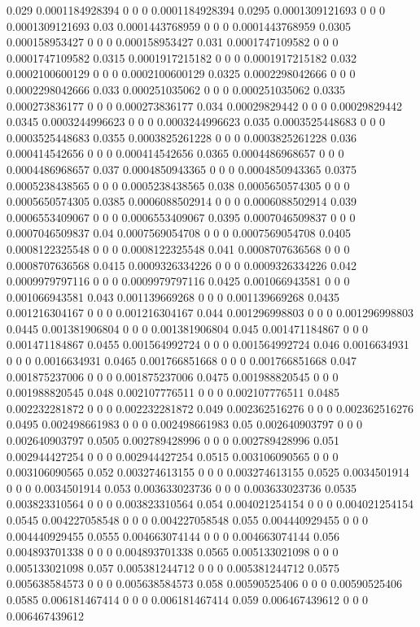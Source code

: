 {0.029 0.0001184928394 0 0 0 0.0001184928394
0.0295 0.0001309121693 0 0 0 0.0001309121693
0.03 0.0001443768959 0 0 0 0.0001443768959
0.0305 0.000158953427 0 0 0 0.000158953427
0.031 0.0001747109582 0 0 0 0.0001747109582
0.0315 0.0001917215182 0 0 0 0.0001917215182
0.032 0.0002100600129 0 0 0 0.0002100600129
0.0325 0.0002298042666 0 0 0 0.0002298042666
0.033 0.000251035062 0 0 0 0.000251035062
0.0335 0.000273836177 0 0 0 0.000273836177
0.034 0.00029829442 0 0 0 0.00029829442
0.0345 0.0003244996623 0 0 0 0.0003244996623
0.035 0.0003525448683 0 0 0 0.0003525448683
0.0355 0.0003825261228 0 0 0 0.0003825261228
0.036 0.000414542656 0 0 0 0.000414542656
0.0365 0.0004486968657 0 0 0 0.0004486968657
0.037 0.0004850943365 0 0 0 0.0004850943365
0.0375 0.0005238438565 0 0 0 0.0005238438565
0.038 0.0005650574305 0 0 0 0.0005650574305
0.0385 0.0006088502914 0 0 0 0.0006088502914
0.039 0.0006553409067 0 0 0 0.0006553409067
0.0395 0.0007046509837 0 0 0 0.0007046509837
0.04 0.0007569054708 0 0 0 0.0007569054708
0.0405 0.0008122325548 0 0 0 0.0008122325548
0.041 0.0008707636568 0 0 0 0.0008707636568
0.0415 0.0009326334226 0 0 0 0.0009326334226
0.042 0.0009979797116 0 0 0 0.0009979797116
0.0425 0.001066943581 0 0 0 0.001066943581
0.043 0.001139669268 0 0 0 0.001139669268
0.0435 0.001216304167 0 0 0 0.001216304167
0.044 0.001296998803 0 0 0 0.001296998803
0.0445 0.001381906804 0 0 0 0.001381906804
0.045 0.001471184867 0 0 0 0.001471184867
0.0455 0.001564992724 0 0 0 0.001564992724
0.046 0.0016634931 0 0 0 0.0016634931
0.0465 0.001766851668 0 0 0 0.001766851668
0.047 0.001875237006 0 0 0 0.001875237006
0.0475 0.001988820545 0 0 0 0.001988820545
0.048 0.002107776511 0 0 0 0.002107776511
0.0485 0.002232281872 0 0 0 0.002232281872
0.049 0.002362516276 0 0 0 0.002362516276
0.0495 0.002498661983 0 0 0 0.002498661983
0.05 0.002640903797 0 0 0 0.002640903797
0.0505 0.002789428996 0 0 0 0.002789428996
0.051 0.002944427254 0 0 0 0.002944427254
0.0515 0.003106090565 0 0 0 0.003106090565
0.052 0.003274613155 0 0 0 0.003274613155
0.0525 0.0034501914 0 0 0 0.0034501914
0.053 0.003633023736 0 0 0 0.003633023736
0.0535 0.003823310564 0 0 0 0.003823310564
0.054 0.004021254154 0 0 0 0.004021254154
0.0545 0.004227058548 0 0 0 0.004227058548
0.055 0.004440929455 0 0 0 0.004440929455
0.0555 0.004663074144 0 0 0 0.004663074144
0.056 0.004893701338 0 0 0 0.004893701338
0.0565 0.005133021098 0 0 0 0.005133021098
0.057 0.005381244712 0 0 0 0.005381244712
0.0575 0.005638584573 0 0 0 0.005638584573
0.058 0.00590525406 0 0 0 0.00590525406
0.0585 0.006181467414 0 0 0 0.006181467414
0.059 0.006467439612 0 0 0 0.006467439612
}
